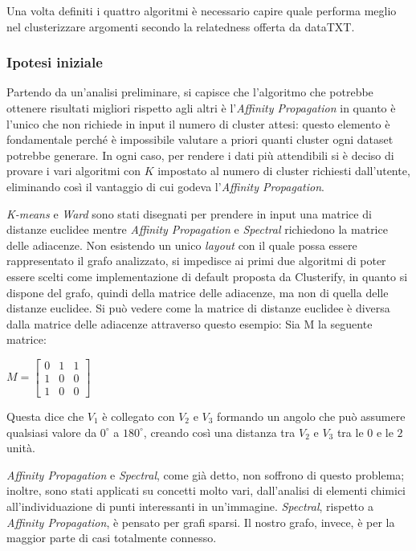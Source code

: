 Una volta definiti i quattro algoritmi è necessario capire quale performa meglio nel clusterizzare argomenti secondo la relatedness offerta da dataTXT.

\subsubsection{Ipotesi iniziale}
Partendo da un'analisi preliminare, si capisce che l'algoritmo che potrebbe ottenere risultati migliori rispetto agli altri è l'\emph{Affinity Propagation} in quanto è l'unico che non richiede in input il numero di cluster attesi: questo elemento è fondamentale perché è impossibile valutare a priori quanti cluster ogni dataset potrebbe generare. In ogni caso, per rendere i dati più attendibili si è deciso di provare i vari algoritmi con $K$ impostato al numero di cluster richiesti dall'utente, eliminando così il vantaggio di cui godeva l'\emph{Affinity Propagation}.

\emph{K-means} e \emph{Ward} sono stati disegnati per prendere in input una matrice di distanze euclidee mentre \emph{Affinity Propagation} e \emph{Spectral} richiedono la matrice delle adiacenze. Non esistendo un unico \emph{layout} con il quale possa essere rappresentato il grafo analizzato, si impedisce ai primi due algoritmi di poter essere scelti come implementazione di default proposta da Clusterify, in quanto si dispone del grafo, quindi della matrice delle adiacenze, ma non di quella delle distanze euclidee. Si può vedere come la matrice di distanze euclidee è diversa dalla matrice delle adiacenze attraverso questo esempio: Sia M la seguente matrice:

\begin{center}
     $M = \begin{bmatrix}
                0 & 1 & 1\\
                1 & 0 & 0\\
                1 & 0 & 0
        \end{bmatrix}$
\end{center}
Questa dice che $V_1$ è collegato con $V_2$ e $V_3$ formando un angolo che può assumere qualsiasi valore da $0^{\circ}$ a $180^{\circ}$, creando così una distanza tra $V_2$ e $V_3$ tra le $0$ e le $2$ unità.
 
\emph{Affinity Propagation} e \emph{Spectral}, come già detto, non soffrono di questo problema; inoltre, sono stati applicati su concetti molto vari, dall'analisi di elementi chimici all'individuazione di punti interessanti in un'immagine. \emph{Spectral}, rispetto a \emph{Affinity Propagation}, è pensato per grafi sparsi. Il nostro grafo, invece, è per la maggior parte di casi totalmente connesso. 

